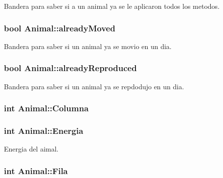 Bandera para saber si a un animal ya se le aplicaron todos los metodos. 

\subsubsection[{\texorpdfstring{already\+Moved}{alreadyMoved}}]{\setlength{\rightskip}{0pt plus 5cm}bool Animal\+::already\+Moved}\hypertarget{classAnimal_a1cc0126c23d1245a1f964ce636552bba}{}\label{classAnimal_a1cc0126c23d1245a1f964ce636552bba}


Bandera para saber si un animal ya se movio en un dia. 

\subsubsection[{\texorpdfstring{already\+Reproduced}{alreadyReproduced}}]{\setlength{\rightskip}{0pt plus 5cm}bool Animal\+::already\+Reproduced}\hypertarget{classAnimal_ab08fe103b56326ac66c63b0f38585c4c}{}\label{classAnimal_ab08fe103b56326ac66c63b0f38585c4c}


Bandera para saber si un animal ya se repdodujo en un dia. 

\subsubsection[{\texorpdfstring{Columna}{Columna}}]{\setlength{\rightskip}{0pt plus 5cm}int Animal\+::\+Columna}\hypertarget{classAnimal_a340d64e6e4ffe5f35e0855c63aad1bd3}{}\label{classAnimal_a340d64e6e4ffe5f35e0855c63aad1bd3}
\subsubsection[{\texorpdfstring{Energia}{Energia}}]{\setlength{\rightskip}{0pt plus 5cm}int Animal\+::\+Energia}\hypertarget{classAnimal_af1c30573e35f61baa10094579c5e741a}{}\label{classAnimal_af1c30573e35f61baa10094579c5e741a}


Energia del aimal. 

\subsubsection[{\texorpdfstring{Fila}{Fila}}]{\setlength{\rightskip}{0pt plus 5cm}int Animal\+::\+Fila}\hypertarget{classAnimal_ab403adfd13b57143eff123bdd6a2febb}{}\label{classAnimal_ab403adfd13b57143eff123bdd6a2febb}



